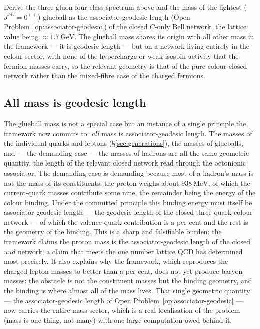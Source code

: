 \begin{openproblem}\label{op:glueball-spectrum}
Derive the three-gluon four-class spectrum above and the mass of the lightest ($J^{PC} = 0^{++}$)
glueball as the associator-geodesic length (Open Problem~\ref{op:associator-geodesic}) of the closed
$C$-only Bell network, the lattice value being $\approx 1.7\ \mathrm{GeV}$. The glueball mass shares
its origin with all other mass in the framework --- it is geodesic length --- but on a network living
entirely in the colour sector, with none of the hypercharge or weak-isospin activity that the fermion
masses carry, so the relevant geometry is that of the pure-colour closed network rather than the
mixed-fibre case of the charged fermions.
\end{openproblem}

\subsection{All mass is geodesic length}

The glueball mass is not a special case but an instance of a single principle the framework now
commits to: \emph{all} mass is associator-geodesic length. The masses of the individual quarks and
leptons (\S\ref{sec:generations}), the masses of glueballs, and --- the demanding case --- the masses
of hadrons are all the same geometric quantity, the length of the relevant closed network read
through the octonionic associator. The demanding case is demanding because most of a hadron's mass is
not the mass of its constituents: the proton weighs about $938\ \mathrm{MeV}$, of which the
current-quark masses contribute some nine, the remainder being the energy of the colour binding. Under
the committed principle this binding energy must itself be associator-geodesic length --- the geodesic
length of the closed three-quark colour network --- of which the valence-quark contribution is a per
cent and the rest is the geometry of the binding. This is a sharp and falsifiable burden: the
framework claims the proton mass is the associator-geodesic length of the closed $uud$ network, a
claim that meets the one number lattice QCD has determined most precisely. It also explains why the
framework, which reproduces the charged-lepton masses to better than a per cent, does not yet produce
baryon masses: the obstacle is not the constituent masses but the binding geometry, and the binding is
where almost all of the mass lives. That single geometric quantity --- the associator-geodesic length
of Open Problem~\ref{op:associator-geodesic} --- now carries the entire mass sector, which is a real
localisation of the problem (mass is one thing, not many) with one large computation owed behind it.

